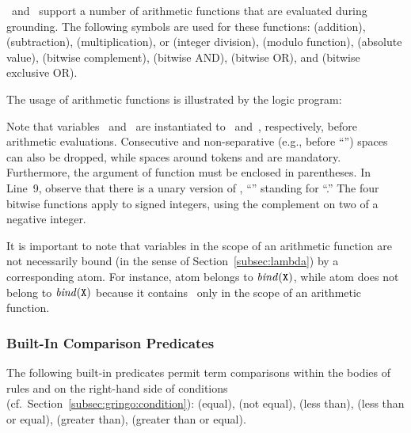 \gringo\ and \clingo\ support a number of arithmetic functions that
are evaluated during grounding.
The following symbols are used for these functions:
\code{+} (addition),
\code{-} (subtraction),
\code{*} (multiplication),
\code{/} or  (integer division),
 (modulo function),
 (absolute value),
\code{\textasciitilde} (bitwise complement),
\code{\&}  (bitwise AND),
   (bitwise OR), and
\code{\^} (bitwise exclusive OR).

\begin{example}\label{ex:arith:fun}
The usage of arithmetic functions is illustrated by the logic program:%
%

%
Note that variables~ and~ are instantiated to~ and~,
respectively, before arithmetic evaluations.
Consecutive and non-separative (e.g., before ``\code{(}'')
spaces can also be dropped,
while spaces around tokens  and  are mandatory.
Furthermore, the argument of function  must be enclosed in parentheses.
In Line~9, observe that there is a unary version of \code{-},
``'' standing for ``.''
The four bitwise functions apply to signed integers,
using the complement on two of a negative integer.
\eexample
\end{example}

It is important to note that variables
in the scope of an arithmetic function are not necessarily bound 
(in the sense of Section~\ref{subsec:lambda}) by a corresponding atom.
For instance, atom  belongs to
$\binders{\var{X}}{r}$, while atom 
does not belong to $\binders{\var{X}}{r}$ because it contains~
only in the scope of an arithmetic function.

\subsubsection{Built-In Comparison Predicates}\label{subsec:gringo:comp}

The following built-in predicates permit term comparisons
within the bodies of rules and on the right-hand side of conditions
(cf.\ Section~\ref{subsec:gringo:condition}):
\code{==} (equal),
\code{!=} (not equal),
\code{<} (less than),
\code{<=} (less than or equal),
\code{>} (greater than),
\code{>=} (greater than or equal).

